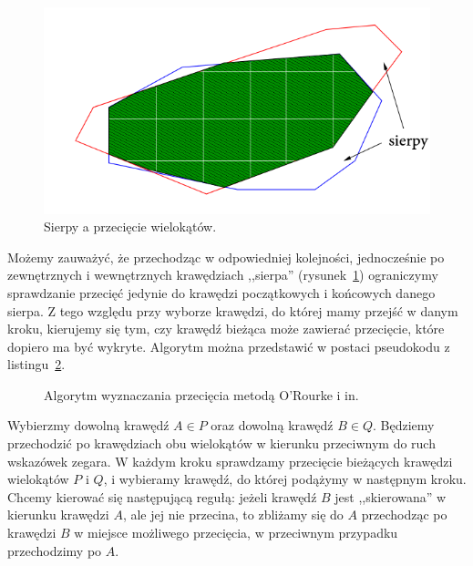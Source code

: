 \begin{figure}[htb]
  \centering
  \includegraphics[scale=0.5]{img/Orourke98}
  \caption{Sierpy a przecięcie wielokątów.\label{img:sickles}}
\end{figure}

Możemy zauważyć, że przechodząc w odpowiedniej kolejności,
jednocześnie po zewnętrznych i wewnętrznych krawędziach ,,sierpa''
(rysunek~\ref{img:sickles}) ograniczymy sprawdzanie przecięć jedynie
do krawędzi początkowych i końcowych danego sierpa. Z tego względu
przy wyborze krawędzi, do której mamy przejść w danym kroku, kierujemy
się tym, czy krawędź bieżąca może zawierać przecięcie, które dopiero
ma być wykryte. Algorytm można przedstawić w postaci pseudokodu z
listingu~\ref{alg:Orourke98}.

\begin{figure}[htp]

  \begin{algorithmic}[1]


    \Repeat

    \EndProcedure
  \end{algorithmic}
  \caption{Algorytm wyznaczania przecięcia metodą O'Rourke i
    in.\label{alg:Orourke98}}
\end{figure}

Wybierzmy dowolną krawędź $A \in P$ oraz dowolną krawędź $B \in
Q$. Będziemy przechodzić po krawędziach obu wielokątów w kierunku
przeciwnym do ruch wskazówek zegara. W każdym kroku sprawdzamy
przecięcie bieżących krawędzi wielokątów $P$ i $Q$, i wybieramy
krawędź, do której podążymy w następnym kroku.  Chcemy kierować się
następującą regułą: jeżeli krawędź $B$ jest ,,skierowana'' w kierunku
krawędzi $A$, ale jej nie przecina, to zbliżamy się do $A$ przechodząc
po krawędzi $B$ w miejsce możliwego przecięcia, w przeciwnym przypadku
przechodzimy po $A$.

